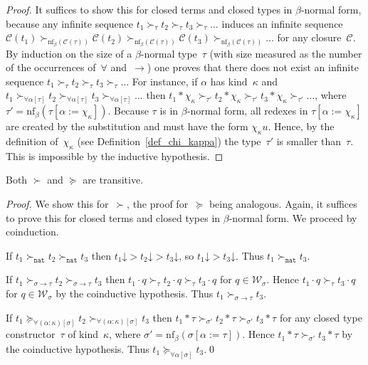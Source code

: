\documentclass[runningheads,a4paper]{llncs}
\newcommand{\World}{\mathcal{W}}
\newcommand{\cl}{\mathcal{C}}
\newcommand{\nf}{\mathrm{nf}}
\newcommand{\arrtype}{\rightarrow}
\newcommand{\app}[2]{#1 \cdot #2}
\newcommand{\tapp}[2]{#1 * #2}
\newcommand{\subst}[2]{#1:=#2}
\newcommand{\nat}{\mathtt{nat}}
\newcommand{\da}{\mathord{\downarrow}}
\begin{document}
\begin{proof}
  It suffices to show this for closed terms and closed types in
  $\beta$-normal form, because any infinite sequence $t_1 \succ_\tau
  t_2 \succ_\tau t_3 \succ_\tau \ldots$ induces an infinite sequence
  $\cl(t_1) \succ_{\nf_\beta(\cl(\tau))} \cl(t_2)
  \succ_{\nf_\beta(\cl(\tau))} \cl(t_3) \succ_{\nf_\beta(\cl(\tau))}
  \ldots$ for any closure~$\cl$. By induction on the size of a
  $\beta$-normal type~$\tau$ (with size measured as the number of the
  occurrences of~$\forall$ and~$\arrtype$) one proves that there does
  not exist an infinite sequence $t_1 \succ_\tau t_2 \succ_\tau t_3
  \succ_\tau \ldots$ For instance, if $\alpha$ has kind~$\kappa$ and
  $t_1 \succ_{\forall\alpha[\tau]} t_2 \succ_{\forall\alpha[\tau]} t_3
  \succ_{\forall\alpha[\tau]} \ldots$ then $\tapp{t_1}{\chi_\kappa}
  \succ_{\tau'} \tapp{t_2}{\chi_\kappa} \succ_{\tau'}
  \tapp{t_3}{\chi_\kappa} \succ_{\tau'} \ldots$, where
  $\tau'=\nf_\beta(\tau[\subst{\alpha}{\chi_\kappa}])$. Because $\tau$
  is in $\beta$-normal form, all redexes in
  $\tau[\subst{\alpha}{\chi_\kappa}]$ are created by the substitution
  and must have the form $\chi_\kappa u$. Hence, by the definition
  of~$\chi_\kappa$ (see Definition~\ref{def_chi_kappa}) the
  type~$\tau'$ is smaller than~$\tau$. This is impossible by the
  inductive hypothesis.
\end{proof}

\begin{lemma}
  Both $\succ$ and $\succeq$ are transitive.
\end{lemma}

\begin{proof}
  We show this for~$\succ$, the proof for~$\succeq$ being
  analogous. Again, it suffices to prove this for closed terms and
  closed types in $\beta$-normal form. We proceed by coinduction.

  If $t_1 \succ_\nat t_2 \succ_\nat t_3$ then $t_1\da > t_2\da >
  t_3\da$, so $t_1\da > t_3\da$. Thus $t_1 \succ_\nat t_3$.

  If $t_1 \succ_{\sigma\arrtype\tau}t_2\succ_{\sigma\arrtype\tau}t_3$
  then $\app{t_1}{q}\succ_{\tau}\app{t_2}{q}\succ_\tau\app{t_3}{q}$
  for $q \in \World_\sigma$. Hence
  $\app{t_1}{q}\succ_\tau\app{t_3}{q}$ for $q \in \World_\sigma$ by
  the coinductive hypothesis. Thus $t_1\succ_{\sigma\arrtype\tau}
  t_3$.

  If $t_1
  \succeq_{\forall(\alpha:\kappa)[\sigma]}t_2\succ_{\forall(\alpha:\kappa)[\sigma]}t_3$
  then
  $\tapp{t_1}{\tau}\succ_{\sigma'}\tapp{t_2}{\tau}\succ_{\sigma'}\tapp{t_3}{\tau}$
  for any closed type constructor~$\tau$ of kind~$\kappa$, where
  $\sigma' = \nf_\beta(\sigma[\subst{\alpha}{\tau}])$. Hence
  $\tapp{t_1}{\tau}\succ_{\sigma'}\tapp{t_3}{\tau}$ by the coinductive
  hypothesis. Thus $t_1\succeq_{\forall\alpha[\sigma]} t_3$.\qed
\end{proof}
\end{document}
